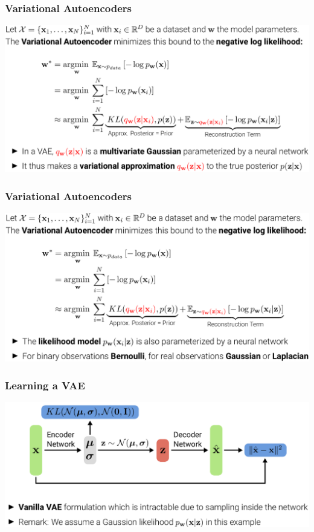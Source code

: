 \documentclass[10pt,aspectratio=169]{beamer}
\begin{document}
\begin{frame}
  \frametitle{Variational Autoencoders}
\begin{center}
\includegraphics[width=.9\textwidth]{images/s41}
\end{center}
\end{frame}

\begin{frame}
  \frametitle{Variational Autoencoders}
\begin{center}
\includegraphics[width=.89\textwidth]{images/s42}
\end{center}
\end{frame}


\begin{frame}
  \frametitle{Learning a VAE}
\begin{center}
\includegraphics[width=.9\textwidth]{images/s43}
\end{center}
\end{frame}
\end{document}
